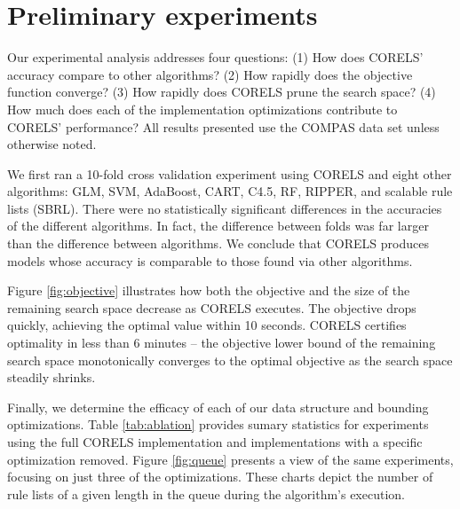 \section{Preliminary experiments}
\label{sec:experiments}

Our experimental analysis addresses four questions:
(1) How does CORELS' accuracy compare to other algorithms?
(2) How rapidly does the objective function converge?
(3) How rapidly does CORELS prune the search space?
(4) How much does each of the implementation optimizations contribute to CORELS' performance?
All results presented use the COMPAS data set unless otherwise noted.

We first ran a 10-fold cross validation experiment using CORELS and eight other algorithms:
GLM, SVM, AdaBoost, CART, C4.5, RF, RIPPER, and scalable rule lists (SBRL).
There were no statistically significant differences in the accuracies of the different
algorithms. In fact, the difference between folds was far larger than the difference
between algorithms. We conclude that CORELS produces models whose accuracy is comparable
to those found via other algorithms.

Figure \ref{fig:objective} illustrates how both the objective and the size of
the remaining search space decrease as CORELS executes.
The objective drops quickly, achieving the optimal value within 10 seconds.
CORELS certifies optimality in less than 6 minutes --
the objective lower bound of the remaining search space
monotonically converges to the optimal objective
as the search space steadily shrinks.

Finally, we determine the efficacy of each of our data structure and bounding
optimizations.
Table \ref{tab:ablation} provides sumary statistics for experiments using
the full CORELS implementation and implementations with a specific
optimization removed.
Figure \ref{fig:queue} presents a view of the same experiments, focusing
on just three of the optimizations. These charts depict the number of rule
lists of a given length in the queue during the algorithm's execution.

